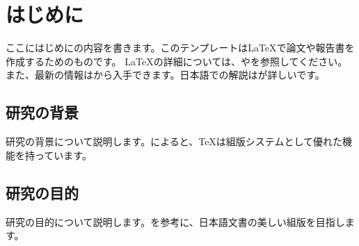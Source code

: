 \section{はじめに}

ここにはじめにの内容を書きます。このテンプレートは\LaTeX{}で論文や報告書を作成するためのものです。
\LaTeX{}の詳細については、\cite{latex_companion}や\cite{knuth}を参照してください。
また、最新の情報は\cite{latex_project}から入手できます。日本語での解説は\cite{japanese_latex_guide}が詳しいです。

\subsection{研究の背景}

研究の背景について説明します。\cite{knuth}によると、\TeX{}は組版システムとして優れた機能を持っています。

\subsection{研究の目的}

研究の目的について説明します。\cite{japanese_latex_guide}を参考に、日本語文書の美しい組版を目指します。 